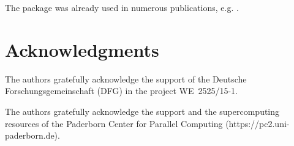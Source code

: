 \documentclass{juliacon}
\begin{document}
The package was already used in numerous publications, e.g. \cite{Friebertshaeuser2022PAMM,Friebertshaeuser2022AIMS,Partmann2023IJF,Partmann2024AAM,Partmann2024PAMM,Tornquist2022PAMM}.



\section{Acknowledgments}
The authors gratefully acknowledge the support of the Deutsche Forschungsgemeinschaft (DFG) in the project \mbox{WE~2525/15-1}.

The authors gratefully acknowledge the support and the supercomputing resources of the Paderborn Center for Parallel Computing (https://pc2.uni-paderborn.de).



\end{document}
